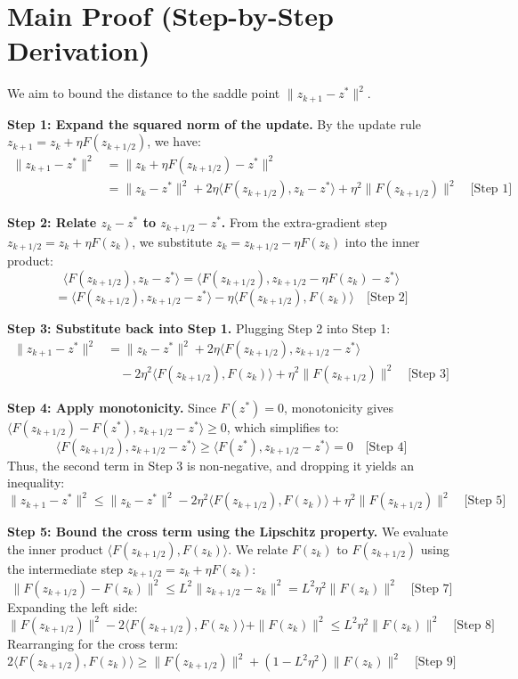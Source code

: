 \documentclass{article}
\begin{document}
\section*{Main Proof (Step-by-Step Derivation)}
We aim to bound the distance to the saddle point $\|z_{k+1} - z^*\|^2$.

\textbf{Step 1: Expand the squared norm of the update.} By the update rule $z_{k+1} = z_k + \eta F(z_{k+1/2})$, we have:
\begin{align*}
\|z_{k+1} - z^*\|^2 &= \|z_k + \eta F(z_{k+1/2}) - z^*\|^2 \\
&= \|z_k - z^*\|^2 + 2\eta \langle F(z_{k+1/2}), z_k - z^* \rangle + \eta^2 \|F(z_{k+1/2})\|^2 \quad \text{[Step 1]}
\end{align*}

\textbf{Step 2: Relate $z_k - z^*$ to $z_{k+1/2} - z^*$.} From the extra-gradient step $z_{k+1/2} = z_k + \eta F(z_k)$, we substitute $z_k = z_{k+1/2} - \eta F(z_k)$ into the inner product:
$$
\langle F(z_{k+1/2}), z_k - z^* \rangle = \langle F(z_{k+1/2}), z_{k+1/2} - \eta F(z_k) - z^* \rangle
$$
$$
= \langle F(z_{k+1/2}), z_{k+1/2} - z^* \rangle - \eta \langle F(z_{k+1/2}), F(z_k) \rangle \quad \text{[Step 2]}
$$

\textbf{Step 3: Substitute back into Step 1.} Plugging Step 2 into Step 1:
\begin{align*}
\|z_{k+1} - z^*\|^2 &= \|z_k - z^*\|^2 + 2\eta \langle F(z_{k+1/2}), z_{k+1/2} - z^* \rangle \\
&\quad - 2\eta^2 \langle F(z_{k+1/2}), F(z_k) \rangle + \eta^2 \|F(z_{k+1/2})\|^2 \quad \text{[Step 3]}
\end{align*}

\textbf{Step 4: Apply monotonicity.} Since $F(z^*) = 0$, monotonicity gives $\langle F(z_{k+1/2}) - F(z^*), z_{k+1/2} - z^* \rangle \geq 0$, which simplifies to:
$$
\langle F(z_{k+1/2}), z_{k+1/2} - z^* \rangle \geq \langle F(z^*), z_{k+1/2} - z^* \rangle = 0 \quad \text{[Step 4]}
$$
Thus, the second term in Step 3 is non-negative, and dropping it yields an inequality:
$$
\|z_{k+1} - z^*\|^2 \leq \|z_k - z^*\|^2 - 2\eta^2 \langle F(z_{k+1/2}), F(z_k) \rangle + \eta^2 \|F(z_{k+1/2})\|^2 \quad \text{[Step 5]}
$$

\textbf{Step 5: Bound the cross term using the Lipschitz property.} We evaluate the inner product $\langle F(z_{k+1/2}), F(z_k) \rangle$. We relate $F(z_k)$ to $F(z_{k+1/2})$ using the intermediate step $z_{k+1/2} = z_k + \eta F(z_k)$:
$$
\|F(z_{k+1/2}) - F(z_k)\|^2 \leq L^2 \|z_{k+1/2} - z_k\|^2 = L^2 \eta^2 \|F(z_k)\|^2 \quad \text{[Step 7]}
$$
Expanding the left side:
$$
\|F(z_{k+1/2})\|^2 - 2\langle F(z_{k+1/2}), F(z_k) \rangle + \|F(z_k)\|^2 \leq L^2 \eta^2 \|F(z_k)\|^2 \quad \text{[Step 8]}
$$
Rearranging for the cross term:
$$
2\langle F(z_{k+1/2}), F(z_k) \rangle \geq \|F(z_{k+1/2})\|^2 + (1 - L^2 \eta^2) \|F(z_k)\|^2 \quad \text{[Step 9]}
$$
\end{document}
